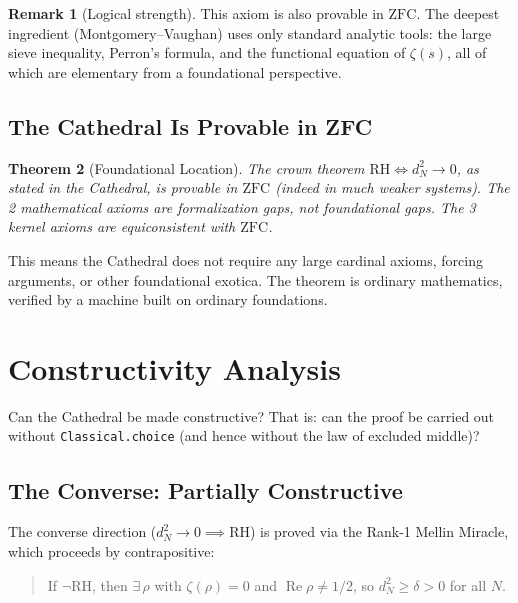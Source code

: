 \documentclass[11pt,a4paper]{article}
\theoremstyle{plain}
\newtheorem{theorem}{Theorem}[section]
\theoremstyle{definition}
\newtheorem{remark}[theorem]{Remark}
\newcommand{\lean}[1]{\texttt{#1}}
\newcommand{\RH}{\ensuremath{\mathrm{RH}}}
\newcommand{\ZFC}{\mathrm{ZFC}}
\newcommand{\re}{\operatorname{Re}}
\begin{document}
\begin{remark}[Logical strength]
This axiom is also provable in $\ZFC$. The deepest ingredient
(Montgomery--Vaughan) uses only standard analytic tools: the large
sieve inequality, Perron's formula, and the functional equation of
$\zeta(s)$, all of which are elementary from a foundational
perspective.
\end{remark}

\subsection{The Cathedral Is Provable in ZFC}

\begin{theorem}[Foundational Location]
\label{thm:zfc}
The crown theorem $\RH \iff d_N^2 \to 0$, as stated in the
Cathedral, is provable in $\ZFC$ (indeed in much weaker systems).
The 2 mathematical axioms are formalization gaps, not foundational
gaps. The 3 kernel axioms are equiconsistent with $\ZFC$.
\end{theorem}

This means the Cathedral does not require any large cardinal axioms,
forcing arguments, or other foundational exotica. The theorem is
ordinary mathematics, verified by a machine built on ordinary
foundations.

\section{Constructivity Analysis}
\label{sec:constructive}

Can the Cathedral be made constructive? That is: can the proof be
carried out without \lean{Classical.choice} (and hence without the
law of excluded middle)?

\subsection{The Converse: Partially Constructive}

The converse direction ($d_N^2 \to 0 \implies \RH$) is proved via
the Rank-1 Mellin Miracle, which proceeds by contrapositive:

\begin{quote}
If $\neg\RH$, then $\exists\,\rho$ with $\zeta(\rho) = 0$ and
$\re\rho \neq 1/2$, so $d_N^2 \geq \delta > 0$ for all $N$.
\end{quote}
\end{document}
